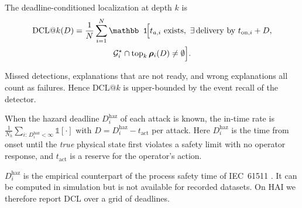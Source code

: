 \begin{definition}[DCL]
The deadline-conditioned localization at depth $k$ is
\begin{multline}\label{eq:dcl}
\mathrm{DCL@}k(D)=\frac1N\sum_{i=1}^{N}\mathbb 1\!\Bigl[t_{a,i}\text{ exists},\ \exists\,\text{delivery by }t_{\mathrm{on},i}+D,\\
\mathcal G_i^\star\cap\operatorname{top}_k\bm\rho_i(D)\neq\emptyset\Bigr].
\end{multline}
\end{definition}
Missed detections, explanations that are not ready, and wrong explanations all count as failures. Hence $\mathrm{DCL@}k$ is upper-bounded by the event recall of the detector.

\begin{definition}
When the hazard deadline $D_i^{\mathrm{haz}}$ of each attack is known, the in-time rate is $\frac1{N_h}\sum_{i:\,D_i^{\mathrm{haz}}<\infty}\mathbb 1[\cdot]$ with $D=D_i^{\mathrm{haz}}-t_{\mathrm{act}}$ per attack. Here $D_i^{\mathrm{haz}}$ is the time from onset until the \emph{true} physical state first violates a safety limit with no operator response, and $t_{\mathrm{act}}$ is a reserve for the operator's action.
\end{definition}

$D_i^{\mathrm{haz}}$ is the empirical counterpart of the process safety time of IEC~61511 \citep{iec61511}. It can be computed in simulation but is not available for recorded datasets. On HAI we therefore report DCL over a grid of deadlines.
